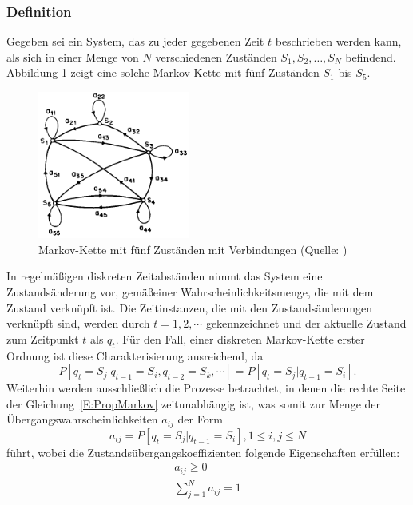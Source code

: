 \subsubsection{Definition}
Gegeben sei ein System, das zu jeder gegebenen Zeit $t$ beschrieben werden kann, als sich in einer Menge von $N$ verschiedenen Zust\"anden
$S_1, S_2, \ldots, S_N$ befindend. Abbildung \ref{fig:MarkovKette} zeigt eine solche Markov-Kette mit f\"unf Zust\"anden $S_1$ bis $S_5$.
\begin{figure}[htb]
\centering
\includegraphics[width=5cm]{img/markov/markov_chain.png}
\caption[Markov-Kette mit f\"unf Zust\"anden]{Markov-Kette mit f\"unf Zust\"anden  mit Verbindungen (Quelle: )}
\label{fig:MarkovKette}
\end{figure}
In regelm\"a\ss igen diskreten Zeitabst\"anden nimmt das System eine Zustands\"anderung vor, gem\"a\ss einer Wahrscheinlichkeitsmenge, die mit dem Zustand verkn\"upft ist. Die Zeitinstanzen, die mit den Zustands\"anderungen verkn\"upft sind, werden durch $t = 1, 2, \cdots$ gekennzeichnet und der aktuelle Zustand zum Zeitpunkt $t$ als $q_t$. F\"ur den Fall, einer diskreten Markov-Kette erster Ordnung ist diese Charakterisierung ausreichend, da
\begin{equation}
\label{E:PropMarkov}
P[q_t = S_j | q_{t-1} = S_i, q_{t-2} = S_k, \cdots]= P[q_t = S_j | q_{t-1} = S_i].
\end{equation}
Weiterhin werden ausschlie\ss lich die Prozesse betrachtet, in denen die rechte Seite der Gleichung~\ref{E:PropMarkov} zeitunabh\"angig ist, was somit zur Menge der \"Ubergangswahrscheinlichkeiten $a_{ij}$ der Form
\begin{equation}
\label{E:PropTrans}
a_{ij} = P[q_t = S_j | q_{t-1} = S_i], 1 \leq i, j \leq N
\end{equation}
f\"uhrt, wobei die Zustands\"ubergangskoeffizienten folgende Eigenschaften erf\"ullen:
\begin{subequations}
\begin{align}
\label{E:MarkovProperties}
a_{ij} \geq 0 \\
\sum_{j = 1}^{N} a_{ij} = 1
\end{align}
\end{subequations}
